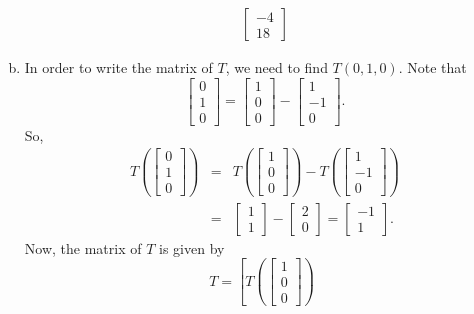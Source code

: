 \begin{enumerate}[a)]
\begin{eqnarray*}
\left[\begin{array}{c}-4\\18\end{array}\right]
\end{eqnarray*}
	\item In order to write the matrix of $T$, we need to find $T(0,1,0)$. Note that
$$
\left[\begin{array}{c}0\\1\\0\end{array}\right] =
\left[\begin{array}{c}1\\0\\0\end{array}\right]
-\left[\begin{array}{c}1\\-1\\0\end{array}\right].
$$
So, 
\begin{eqnarray*}
T\left(\left[\begin{array}{c}0\\1\\0\end{array}\right]\right) &=&
T\left(\left[\begin{array}{c}1\\0\\0\end{array}\right]\right)
-T\left(\left[\begin{array}{c}1\\-1\\0\end{array}\right]\right)\\
&=& \left[\begin{array}{c}1\\1\end{array}\right]
-\left[\begin{array}{c}2\\0\end{array}\right] =
\left[\begin{array}{c}-1\\1\end{array}\right].
\end{eqnarray*}
Now, the matrix of $T$ is given by
$$
T = \left[T\left(\left[\begin{array}{c}1\\0\\0\end{array}\right]\right)\hspace{5pt}
$$
\end{enumerate}
